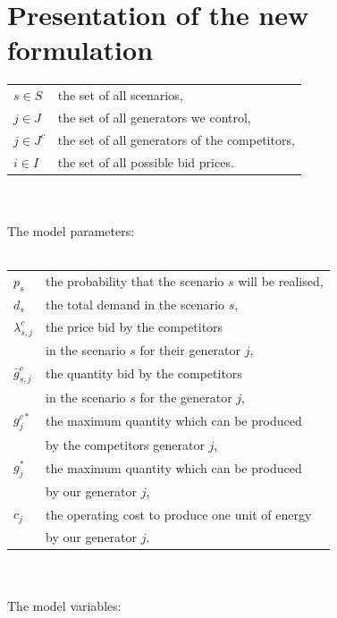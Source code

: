 \documentclass[letterpaper]{article}
\begin{document}
\section{Presentation of the new formulation}
\begin{tabular}{ll}
$s \in S$ & the set of all scenarios, \\
$j \in J$ & the set of all generators we control, \\
$j \in J^c$ & the set of all generators of the competitors, \\
$i \in I$ & the set of all possible bid prices.
\end{tabular}\\ \\
The model parameters:\\ \\
\begin{tabular}{ll}
$p_s$ & the probability that the scenario $s$ will be realised, \\
$d_s$ & the total demand in the scenario $s$, \\
$\lambda^c_{s,j}$ & the price bid by the competitors \\
 & in the scenario $s$ for their generator $j$, \\
$\bar{g}^c_{s,j}$ & the quantity bid by the competitors \\
& in the scenario $s$ for the generator $j$, \\
$g^{c*}_j$ & the maximum quantity which can be produced \\
& by the competitors generator $j$, \\
$g^*_j$ & the maximum quantity which can be produced \\
 & by our generator $j$, \\
$c_j$ & the operating cost to produce one unit of energy \\
 & by our generator $j$.
\end{tabular}\\ \\

The model variables:
\end{document}
